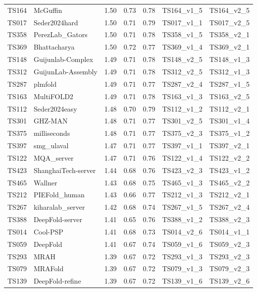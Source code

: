 \begin{longtable}{lllllll}
TS164 & McGuffin & 1.50 & 0.73 & 0.78 & TS164\_v1\_5 & TS164\_v2\_5 \\ 
TS017 & Seder2024hard & 1.50 & 0.71 & 0.79 & TS017\_v1\_1 & TS017\_v2\_5 \\ 
TS358 & PerezLab\_Gators & 1.50 & 0.71 & 0.78 & TS358\_v1\_5 & TS358\_v2\_1 \\ 
TS369 & Bhattacharya & 1.50 & 0.72 & 0.77 & TS369\_v1\_4 & TS369\_v2\_1 \\ 
TS148 & Guijunlab-Complex & 1.49 & 0.71 & 0.78 & TS148\_v2\_5 & TS148\_v1\_3 \\ 
TS312 & GuijunLab-Assembly & 1.49 & 0.71 & 0.78 & TS312\_v2\_5 & TS312\_v1\_3 \\ 
TS287 & plmfold & 1.49 & 0.71 & 0.77 & TS287\_v2\_4 & TS287\_v1\_5 \\ 
TS163 & MultiFOLD2 & 1.49 & 0.71 & 0.78 & TS163\_v1\_3 & TS163\_v2\_5 \\ 
TS112 & Seder2024easy & 1.48 & 0.70 & 0.79 & TS112\_v1\_2 & TS112\_v2\_1 \\ 
TS301 & GHZ-MAN & 1.48 & 0.71 & 0.77 & TS301\_v2\_5 & TS301\_v1\_4 \\ 
TS375 & milliseconds & 1.48 & 0.71 & 0.77 & TS375\_v2\_3 & TS375\_v1\_2 \\ 
TS397 & smg\_ulaval & 1.47 & 0.71 & 0.77 & TS397\_v1\_1 & TS397\_v2\_1 \\ 
TS122 & MQA\_server & 1.47 & 0.71 & 0.76 & TS122\_v1\_4 & TS122\_v2\_2 \\ 
TS423 & ShanghaiTech-server & 1.44 & 0.68 & 0.76 & TS423\_v2\_3 & TS423\_v1\_2 \\ 
TS465 & Wallner & 1.43 & 0.68 & 0.75 & TS465\_v1\_3 & TS465\_v2\_2 \\ 
TS212 & PIEFold\_human & 1.43 & 0.66 & 0.77 & TS212\_v1\_3 & TS212\_v2\_1 \\ 
TS267 & kiharalab\_server & 1.42 & 0.68 & 0.74 & TS267\_v1\_5 & TS267\_v2\_4 \\ 
TS388 & DeepFold-server & 1.41 & 0.65 & 0.76 & TS388\_v1\_2 & TS388\_v2\_3 \\ 
TS014 & Cool-PSP & 1.41 & 0.68 & 0.73 & TS014\_v2\_6 & TS014\_v1\_1 \\ 
TS059 & DeepFold & 1.41 & 0.67 & 0.74 & TS059\_v1\_6 & TS059\_v2\_3 \\ 
TS293 & MRAH & 1.39 & 0.67 & 0.72 & TS293\_v1\_3 & TS293\_v2\_3 \\ 
TS079 & MRAFold & 1.39 & 0.67 & 0.72 & TS079\_v1\_3 & TS079\_v2\_3 \\ 
TS139 & DeepFold-refine & 1.39 & 0.67 & 0.72 & TS139\_v1\_6 & TS139\_v2\_6 \\ 

\end{longtable}
